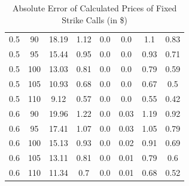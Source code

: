 \documentclass{article}
\begin{document}
\begin{table}[H]
\begin{tabular}{|c|c|c|c|c|c|c|c|}
  0.5 & 90 & 18.19 & 1.12 & 0.0 & 0.0 & 1.1 & 0.83 \\
  0.5 & 95 & 15.44 & 0.95 & 0.0 & 0.0 & 0.93 & 0.71 \\
  0.5 & 100 & 13.03 & 0.81 & 0.0 & 0.0 & 0.79 & 0.59 \\
  0.5 & 105 & 10.93 & 0.68 & 0.0 & 0.0 & 0.67 & 0.5 \\
  0.5 & 110 & 9.12 & 0.57 & 0.0 & 0.0 & 0.55 & 0.42 \\
  0.6 & 90 & 19.96 & 1.22 & 0.0 & 0.03 & 1.19 & 0.92 \\
  0.6 & 95 & 17.41 & 1.07 & 0.0 & 0.03 & 1.05 & 0.79 \\
  0.6 & 100 & 15.13 & 0.93 & 0.0 & 0.02 & 0.91 & 0.69 \\
  0.6 & 105 & 13.11 & 0.81 & 0.0 & 0.01 & 0.79 & 0.6 \\
  0.6 & 110 & 11.34 & 0.7 & 0.0 & 0.01 & 0.68 & 0.52 \\
  \hline
  \end{tabular}
  \caption{Absolute Error of Calculated Prices of Fixed Strike Calls (in \$)}
  \label{table:name}
\end{table}
\end{document}
